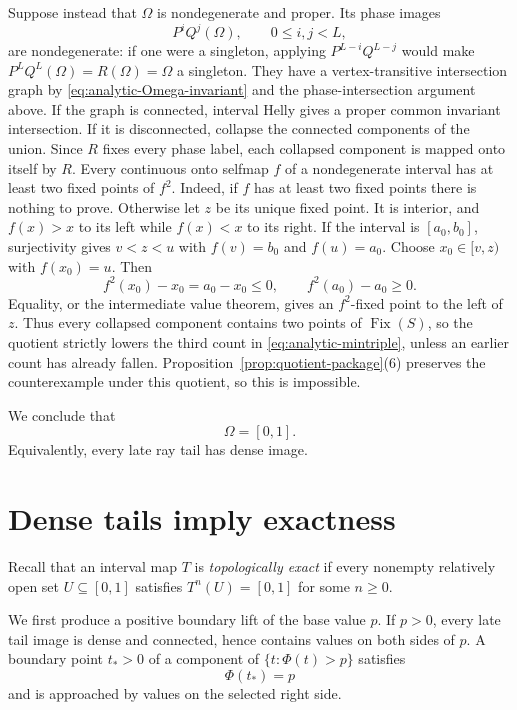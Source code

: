 \documentclass[11pt]{article}
\theoremstyle{definition}
\theoremstyle{remark}
\newcommand{\I}{[0,1]}
\newcommand{\Fix}{\operatorname{Fix}}
\begin{document}
Suppose instead that \(\Omega\) is nondegenerate and proper.  Its phase
images
\[
 P^iQ^j(\Omega),\qquad0\leq i,j<L,
\]
are nondegenerate: if one were a singleton, applying
\(P^{L-i}Q^{L-j}\) would make
\(P^LQ^L(\Omega)=R(\Omega)=\Omega\) a singleton.  They have a
vertex-transitive intersection graph by
\eqref{eq:analytic-Omega-invariant} and the phase-intersection argument
above.  If the
graph is connected, interval Helly gives a proper common invariant
intersection.  If it is disconnected, collapse the connected components of
the union.  Since \(R\) fixes every phase label, each collapsed component is
mapped onto itself by \(R\).  Every continuous onto selfmap \(f\) of a
nondegenerate interval has at least two fixed points of \(f^2\).  Indeed, if
\(f\) has at least two fixed points there is nothing to prove.  Otherwise
let \(z\) be its unique fixed point.  It is interior, and
\(f(x)>x\) to its left while \(f(x)<x\) to its right.  If the interval is
\([a_0,b_0]\), surjectivity gives \(v<z<u\) with
\(f(v)=b_0\) and \(f(u)=a_0\).  Choose \(x_0\in[v,z)\) with \(f(x_0)=u\).
Then
\[
 f^2(x_0)-x_0=a_0-x_0\leq0,\qquad
 f^2(a_0)-a_0\geq0.
\]
Equality, or the intermediate value theorem, gives an \(f^2\)-fixed point
to the left of \(z\).  Thus every collapsed component
contains two points of \(\Fix(S)\), so the quotient strictly lowers the
third count in \eqref{eq:analytic-mintriple}, unless an earlier count has
already fallen.  Proposition~\ref{prop:quotient-package}(6) preserves the
counterexample under this quotient, so this is impossible.

We conclude that
\begin{equation}\label{eq:analytic-Omega-full}
 \Omega=\I.
\end{equation}
Equivalently, every late ray tail has dense image.

\section{Dense tails imply exactness}

Recall that an interval map \(T\) is \emph{topologically exact} if every
nonempty relatively open set \(U\subseteq\I\) satisfies
\(T^n(U)=\I\) for some \(n\geq0\).

We first produce a positive boundary lift of the base value \(p\).
If \(p>0\), every late tail image is dense and connected, hence contains
values on both sides of \(p\).  A boundary point \(t_*>0\) of a component of
\(\{t:\Phi(t)>p\}\) satisfies
\begin{equation}\label{eq:analytic-boundary-lift}
 \Phi(t_*)=p
\end{equation}
and is approached by values on the selected right side.
\end{document}
